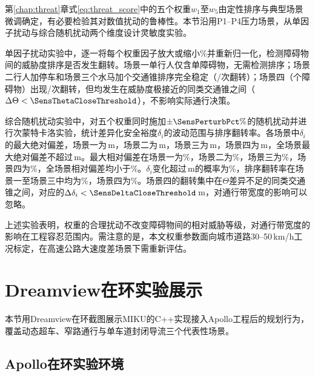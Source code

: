 第\ref{chap:threat}章式\eqref{eq:threat_score}中的五个权重$w_1$至$w_5$由定性排序与典型场景微调确定，有必要检验其对数值扰动的鲁棒性。本节沿用P1--P4压力场景，从单因子扰动与综合随机扰动两个维度设计灵敏度实验。

单因子扰动实验中，逐一将每个权重因子放大或缩小\SensPerturbPct\%并重新归一化，检测障碍物间的威胁度排序是否发生翻转。场景一单行人仅含单障碍物，无需检测排序；场景二行人加停车和场景三\NarrowCmpConeCountPerSide{}个水马加\NarrowCmpConeCountPerSide{}个交通锥排序完全稳定（\SensTwoSingleFlipCnt{}/\SensSingleFactorTrialCount 次翻转）；场景四（\DenseConstructionTotalObstacles 个障碍物）出现\SensFourSingleFlipCnt{}/\SensSingleFactorTrialCount 次翻转，但均发生在威胁度极接近的同类交通锥之间（$\Delta\Theta < \SensThetaCloseThreshold$），不影响实际通行决策。

综合随机扰动实验中，对五个权重同时施加$\pm\SensPerturbPct\%$的随机扰动并进行\SensTrialCount 次蒙特卡洛实验，统计差异化安全裕度$\delta_i$的波动范围与排序翻转率。各场景中$\delta_i$的最大绝对偏差，场景一为\SensOneMcMaxAbsDev{}\,m，场景二为\SensTwoMcMaxAbsDev{}\,m，场景三为\SensThreeMcMaxAbsDev{}\,m，场景四为\SensFourMcMaxAbsDev{}\,m，全场景最大绝对偏差不超过\SensWorstAbsDev{}\,m。最大相对偏差在场景一为\SensOneMcMaxRelDev{}\%，场景二为\SensTwoMcMaxRelDev{}\%，场景三为\SensThreeMcMaxRelDev{}\%，场景四为\SensFourMcMaxRelDev{}\%，全场景相对偏差均小于\SensWorstRelDev{}\%。$\delta_i$变化超过\SensDeltaExceedThreshold\,m的概率为\SensFourMcExceedProb{}\%，排序翻转率在场景一至场景三中均为\SensOneMcFlipRate{}\%，场景四为\SensFourMcFlipRate{}\%。场景四的翻转集中在$\Theta$差异不足\SensThetaCloseThreshold 的同类交通锥之间，对应的$\Delta\delta_i < \SensDeltaCloseThreshold$\,m，对通行带宽度的影响可以忽略。

上述实验表明，权重的合理扰动不改变障碍物间的相对威胁等级，对通行带宽度的影响在工程容忍范围内。需注意的是，本文权重参数面向城市道路30--50\,km/h工况标定，在高速公路大速度差场景下需重新评估。

\section{Dreamview在环实验展示}
\label{sec:dreamview_demo}

本节用Dreamview在环截图展示MIKU的C++实现接入Apollo工程后的规划行为，覆盖动态超车、窄路通行与单车道封闭导流三个代表性场景。

\subsection{Apollo在环实验环境}

